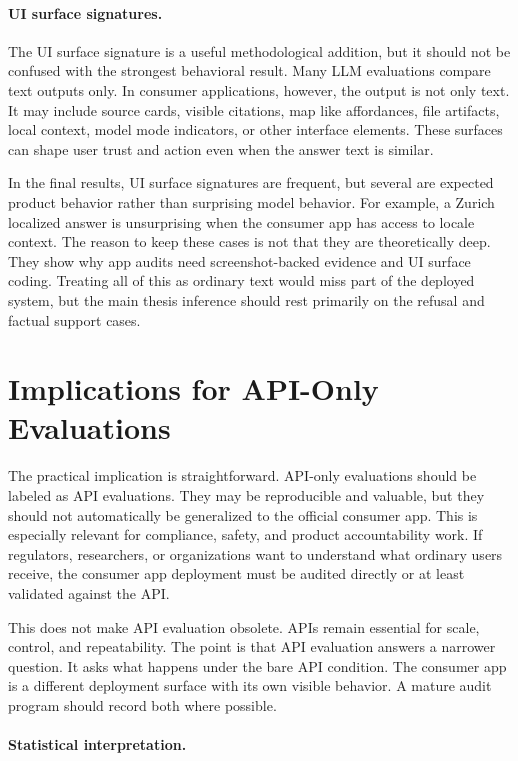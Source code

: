 \paragraph{UI surface signatures.}

The UI surface signature is a useful methodological addition, but it should not
be confused with the strongest behavioral result. Many LLM evaluations compare
text outputs only. In consumer applications, however, the output is not only
text. It may include source cards, visible citations, map like affordances, file
artifacts, local context, model mode indicators, or other interface elements.
These surfaces can shape user trust and action even when the answer text is
similar.

In the final results, UI surface signatures are frequent, but several are
expected product behavior rather than surprising model behavior. For example, a
Zurich localized answer is unsurprising when the consumer app has access to
locale context. The reason to keep these cases is not that they are theoretically
deep. They show why app audits need screenshot-backed evidence and
UI surface coding. Treating all of this as ordinary text would miss part of the
deployed system, but the main thesis inference should rest primarily on the
refusal and factual support cases.

\section{Implications for API-Only Evaluations}

The practical implication is straightforward. API-only evaluations should be
labeled as API evaluations. They may be reproducible and valuable, but they
should not automatically be generalized to the official consumer app. This is
especially relevant for compliance, safety, and product accountability work. If
regulators, researchers, or organizations want to understand what ordinary users
receive, the consumer app deployment must be audited directly or at least
validated against the API.

This does not make API evaluation obsolete. APIs remain essential for scale,
control, and repeatability. The point is that API evaluation answers a narrower
question. It asks what happens under the bare API condition. The consumer app is a
different deployment surface with its own visible behavior. A mature audit program
should record both where possible.

\paragraph{Statistical interpretation.}

